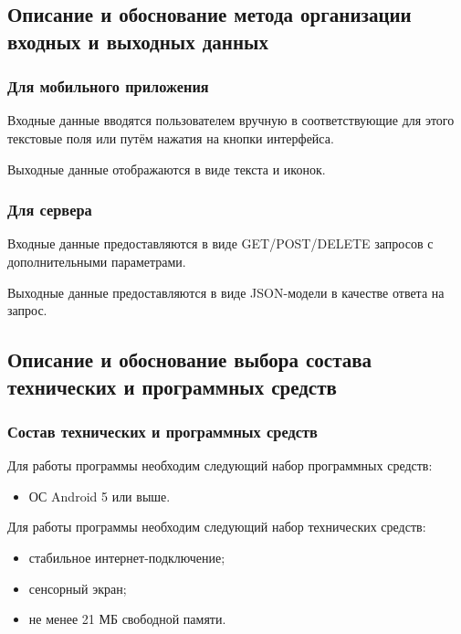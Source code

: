 \documentclass{../includes/TechDoc}
\begin{document}
    \subsection{Описание и обоснование метода организации входных и выходных данных}

    \subsubsection{Для мобильного приложения}

    Входные данные вводятся пользователем вручную в соответствующие для этого текстовые поля или путём нажатия на кнопки интерфейса.

    Выходные данные отображаются в виде текста и иконок.

    \subsubsection{Для сервера}

    Входные данные предоставляются в виде GET/POST/DELETE запросов с дополнительными параметрами.

    Выходные данные предоставляются в виде JSON-модели в качестве ответа на запрос.

    \subsection{Описание и обоснование выбора состава технических и программных средств}

    \subsubsection{Состав технических и программных средств}

    Для работы программы необходим следующий набор программных средств:
    \begin{itemize}
        \item ОС Android 5 или выше.
    \end{itemize}

    Для работы программы необходим следующий набор технических средств:
    \begin{itemize}
        \item стабильное интернет-подключение;
        \item сенсорный экран;
        \item не менее 21 МБ свободной памяти.
    \end{itemize}
\end{document}
